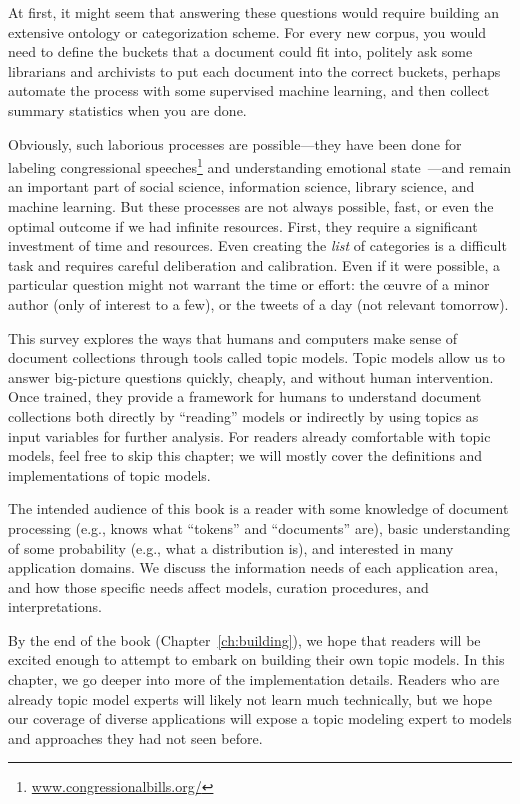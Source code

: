 At first, it might seem that answering these questions would require building an
extensive ontology or categorization scheme.  For every new corpus, you would
need to define  the buckets that a document could fit into, politely ask some librarians and
archivists to put each document into the correct buckets, perhaps automate the
process with some supervised machine learning, and then collect summary
statistics when you are done.

Obviously, such laborious processes are possible---they have been done
for labeling congressional
speeches\footnote{\url{www.congressionalbills.org/}} and understanding
emotional state~\citep{wiebestates}---and remain an important part of
social science, information science, library science, and machine
learning.  But these processes are not always possible, fast, or even
the optimal outcome if we had infinite resources.  First, they
 require a significant investment of time and resources.
Even creating the \emph{list} of categories is a difficult task and
requires careful deliberation and calibration.  Even if it were possible, a
particular question might not warrant the time or effort: the \oe{}uvre
of a minor author (only of interest to a few), or the tweets of a day
(not relevant tomorrow).

This survey explores the ways that humans and
computers make sense of document collections through tools called topic models.
Topic models allow us to answer big-picture questions quickly, cheaply, and without human intervention.
Once trained, they provide a framework for humans to understand document collections both directly by ``reading'' models or indirectly by using topics as input variables for further analysis.
For readers already comfortable with topic models, feel free to skip this
chapter; we will mostly cover the definitions and implementations of topic models.

The intended audience of this book is a reader with some knowledge of
document processing (e.g., knows what ``tokens'' and ``documents''
are), basic understanding of some probability (e.g., what a
distribution is), and interested in many application domains.  We
discuss the information needs of each application area, and how those
specific needs affect models, curation procedures, and
interpretations.

By the end of the book (Chapter~\ref{ch:building}), we hope that
readers will be excited enough to attempt to embark on building their
own topic models.  In this chapter, we go deeper into more of the
implementation details.  Readers who are already topic model experts
will likely not learn much technically, but we hope our coverage of
diverse applications will expose a topic modeling expert to models and
approaches they had not seen before.


